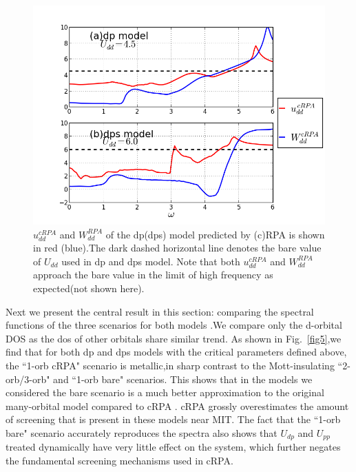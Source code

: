 \documentclass[10pt]{ruthesis}
\begin{document}
{%



\begin{figure}[H]
 \includegraphics[width=\columnwidth]{./plotForpublishing/dp+pds_Udduw.png}
 \caption{\label{fig4}$u^{cRPA}_{dd}$ and $W^{RPA}_{dd}$ of the dp(dps) model predicted by (c)RPA is shown in red (blue).The dark dashed horizontal line denotes the bare value of $U_{dd}$ used in dp and dps model. Note that both $u^{cRPA}_{dd}$ and $W^{RPA}_{dd}$ approach the bare value in the limit of high frequency as expected(not shown here). }
\end{figure}






Next we present the central result in this section: comparing the spectral functions of the three scenarios for both models .We compare only the d-orbital DOS  as the dos of other orbitals share similar trend. As shown in Fig.~\ref{fig5},we find that for both dp and dps models with the critical parameters defined above, the ``1-orb cRPA" scenario is metallic,in sharp contrast to the Mott-insulating ``2-orb/3-orb" and ``1-orb bare" scenarios. This shows that in the models we considered the bare scenario is a much better approximation to the original many-orbital model compared to cRPA . cRPA grossly overestimates the amount of screening that is present in these models near MIT. The fact that the ``1-orb bare" scenario accurately reproduces the spectra also shows that $U_{dp}$ and $U_{pp}$ treated dynamically have very little effect on the system, which further negates the fundamental screening mechanisms used in cRPA.

}
\end{document}
